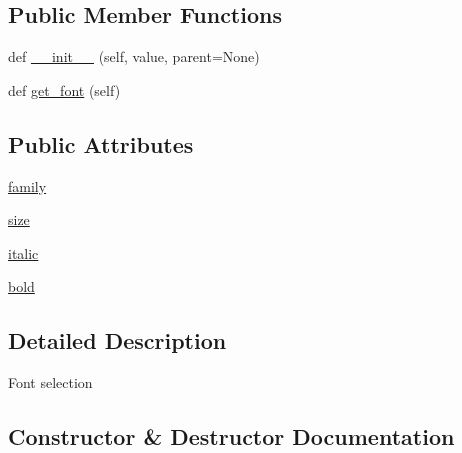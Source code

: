 \subsection*{Public Member Functions}
\begin{DoxyCompactItemize}
\item 
def \hyperlink{classmatplotlib_1_1backends_1_1qt__editor_1_1__formlayout_1_1FontLayout_adf5bc36fd06ddf91f030478e8b5ae02a}{\+\_\+\+\_\+init\+\_\+\+\_\+} (self, value, parent=None)
\item 
def \hyperlink{classmatplotlib_1_1backends_1_1qt__editor_1_1__formlayout_1_1FontLayout_af431f402fc4c5e1274835d92c7b06e6a}{get\+\_\+font} (self)
\end{DoxyCompactItemize}
\subsection*{Public Attributes}
\begin{DoxyCompactItemize}
\item 
\hyperlink{classmatplotlib_1_1backends_1_1qt__editor_1_1__formlayout_1_1FontLayout_a6242abc0594f99b693032bbcc34780a1}{family}
\item 
\hyperlink{classmatplotlib_1_1backends_1_1qt__editor_1_1__formlayout_1_1FontLayout_a75c2e251c9dbe74f50b49309432348c6}{size}
\item 
\hyperlink{classmatplotlib_1_1backends_1_1qt__editor_1_1__formlayout_1_1FontLayout_a3afabb97a6fe8d5a67d2fa7141484681}{italic}
\item 
\hyperlink{classmatplotlib_1_1backends_1_1qt__editor_1_1__formlayout_1_1FontLayout_a106d852a3baf20f72b6cc42c4150829f}{bold}
\end{DoxyCompactItemize}


\subsection{Detailed Description}
\begin{DoxyVerb}Font selection\end{DoxyVerb}
 

\subsection{Constructor \& Destructor Documentation}
\mbox{\label{classmatplotlib_1_1backends_1_1qt__editor_1_1__formlayout_1_1FontLayout_adf5bc36fd06ddf91f030478e8b5ae02a}} 
